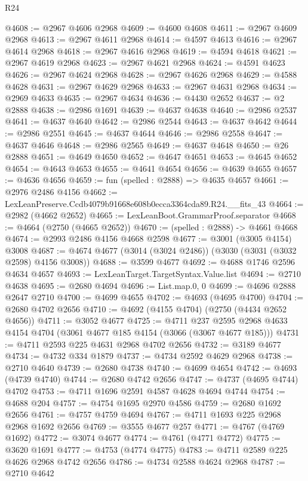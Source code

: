 \begin{lexlean}{R24}
\begin{coremodule}
@4608 := @2967 @4606 @2968
@4609 := @4600 @4608
@4611 := @2967 @4609 @2968
@4613 := @2967 @4611 @2968
@4614 := @4597 @4613
@4616 := @2967 @4614 @2968
@4618 := @2967 @4616 @2968
@4619 := @4594 @4618
@4621 := @2967 @4619 @2968
@4623 := @2967 @4621 @2968
@4624 := @4591 @4623
@4626 := @2967 @4624 @2968
@4628 := @2967 @4626 @2968
@4629 := @4588 @4628
@4631 := @2967 @4629 @2968
@4633 := @2967 @4631 @2968
@4634 := @2969 @4633
@4635 := @2967 @4634
@4636 := @4430 @2652
@4637 := @2 @2888
@4638 := @2986 @1691
@4639 := @4637 @4638
@4640 := @2986 @2537
@4641 := @4637 @4640
@4642 := @2986 @2544
@4643 := @4637 @4642
@4644 := @2986 @2551
@4645 := @4637 @4644
@4646 := @2986 @2558
@4647 := @4637 @4646
@4648 := @2986 @2565
@4649 := @4637 @4648
@4650 := @26 @2888
@4651 := @4649 @4650
@4652 := @4647 @4651
@4653 := @4645 @4652
@4654 := @4643 @4653
@4655 := @4641 @4654
@4656 := @4639 @4655
@4657 := @4636 @4656
@4659 := fun (spelled : @2888) => @4635 @4657
@4661 := @2976 @2486 @4156
@4662 := LexLeanPreserve.Ccdb4079b91668e608b0ecca3364cda89.R24.__fits_43
@4664 := @2982 (@4662 @2652)
@4665 := LexLeanBoot.GrammarProof.separator
@4668 := @4664 (@2750 (@4665 @2652))
@4670 := (spelled : @2888) -> @4661 @4668
@4674 := @2993 @2486 @4156 @4668 @2598
@4677 := @3001 (@3005 @4154) @3008
@4687 := @4674 @4677 (@3014 (@3024 @2486)) (@3030 (@3031 (@3032 @2598) @4156 @3008))
@4688 := @3599 @4677
@4692 := @4688 @1746 @2596 @4634 @4657
@4693 := LexLeanTarget.TargetSyntax.Value.list
@4694 := @2710 @4638
@4695 := @2680 @4694
@4696 := List.map.{0, 0}
@4699 := @4696 @2888 @2647 @2710
@4700 := @4699 @4655
@4702 := @4693 (@4695 @4700)
@4704 := @2680 @4702 @2656
@4710 := @4692 (@4155 @4704) (@2750 (@4434 @2652 @4656))
@4711 := @3052 @4677
@4725 := @4711
    @237
    @2595
    @2968
    @4633
    @4154
    @4704
    (@3061 @4677 @185 @4154 (@3066 (@3067 @4677 @185)))
@4731 := @4711 @2593 @225 @4631 @2968 @4702 @2656
@4732 := @3189 @4677
@4734 := @4732 @334 @1879
@4737 := @4734 @2592 @4629 @2968
@4738 := @2710 @4640
@4739 := @2680 @4738
@4740 := @4699 @4654
@4742 := @4693 (@4739 @4740)
@4744 := @2680 @4742 @2656
@4747 := @4737 (@4695 @4744) @4702
@4753 := @4711 @1696 @2591 @4587 @4628 @4694 @4744
@4754 := @4688 @204
@4757 := @4754 @1695 @2970 @4586
@4759 := @2680 @1692 @2656
@4761 := @4757 @4759 @4694
@4767 := @4711 @1693 @225 @2968 @2968 @1692 @2656
@4769 := @3555 @4677 @257
@4771 := @4767 (@4769 @1692)
@4772 := @3074 @4677
@4774 := @4761 (@4771 @4772)
@4775 := @3620 @1691
@4777 := @4753 (@4774 @4775)
@4783 := @4711 @2589 @225 @4626 @2968 @4742 @2656
@4786 := @4734 @2588 @4624 @2968
@4787 := @2710 @4642

\end{coremodule}
\end{lexlean}
